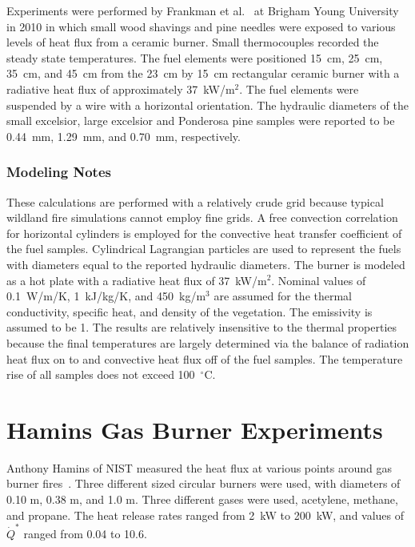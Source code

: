 Experiments were performed by Frankman et al.~\cite{Frankman:CST2010} at Brigham Young University in 2010 in which small wood shavings and pine needles were exposed to various levels of heat flux from a ceramic burner. Small thermocouples recorded the steady state temperatures. The fuel elements were positioned 15~cm, 25~cm, 35~cm, and 45~cm from the 23~cm by 15~cm rectangular ceramic burner with a radiative heat flux of approximately 37~kW/m$^2$. The fuel elements were suspended by a wire with a horizontal orientation. The hydraulic diameters of the small excelsior, large excelsior and Ponderosa pine samples were reported to be 0.44~mm, 1.29~mm, and 0.70~mm, respectively.

\subsubsection{Modeling Notes}

These calculations are performed with a relatively crude grid because typical wildland fire simulations cannot employ fine grids. A free convection correlation for horizontal cylinders is employed for the convective heat transfer coefficient of the fuel samples. Cylindrical Lagrangian particles are used to represent the fuels with diameters equal to the reported hydraulic diameters. The burner is modeled as a hot plate with a radiative heat flux of 37~kW/m$^2$. Nominal values of 0.1~W/m/K, 1~kJ/kg/K, and 450~kg/m$^3$ are assumed for the thermal conductivity, specific heat, and density of the vegetation. The emissivity is assumed to be 1. The results are relatively insensitive to the thermal properties because the final temperatures are largely determined via the balance of radiation heat flux on to and convective heat flux off of the fuel samples. The temperature rise of all samples does not exceed 100~$^\circ$C.


\section{Hamins Gas Burner Experiments}
\label{Hamins_Gas_Burner_Description}

Anthony Hamins of NIST measured the heat flux at various points around gas burner fires~\cite{Hostikka:3}. Three different sized circular burners were used, with diameters of 0.10 m, 0.38 m, and 1.0 m. Three different gases were used, acetylene, methane, and propane. The heat release rates ranged from 2~kW to 200~kW, and values of $\dot{Q}^*$ ranged from 0.04 to 10.6.


